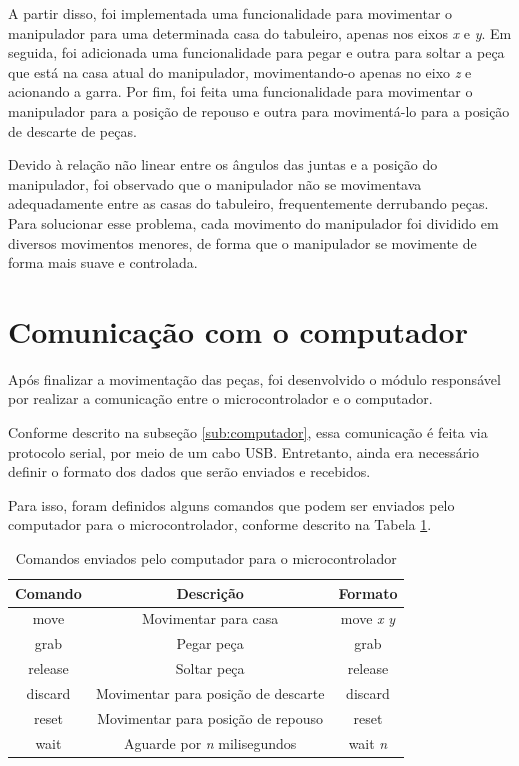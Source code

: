 A partir disso, foi implementada uma funcionalidade para movimentar o manipulador para uma determinada casa do tabuleiro, apenas nos eixos \textit{x} e \textit{y}.
Em seguida, foi adicionada uma funcionalidade para pegar e outra para soltar a peça que está na casa atual do manipulador, movimentando-o apenas no eixo \textit{z} e acionando a garra.
Por fim, foi feita uma funcionalidade para movimentar o manipulador para a posição de repouso e outra para movimentá-lo para a posição de descarte de peças.

Devido à relação não linear entre os ângulos das juntas e a posição do manipulador,
foi observado que o manipulador não se movimentava adequadamente entre as casas do tabuleiro,
frequentemente derrubando peças.
Para solucionar esse problema, cada movimento do manipulador foi dividido em diversos movimentos menores,
de forma que o manipulador se movimente de forma mais suave e controlada.

\section[Comunicação com o computador]{Comunicação com o computador}
\label{sec:comunicacaoComputador}

Após finalizar a movimentação das peças, foi desenvolvido o módulo responsável por realizar a comunicação entre o microcontrolador e o computador.

Conforme descrito na subseção \ref{sub:computador}, essa comunicação é feita via protocolo serial, por meio de um cabo USB.
Entretanto, ainda era necessário definir o formato dos dados que serão enviados e recebidos.

Para isso, foram definidos alguns comandos que podem ser enviados pelo computador para o microcontrolador, conforme descrito na Tabela \ref{tab:comandosMicrocontrolador}.

\begin{table}[H]
    \centering
    \caption{Comandos enviados pelo computador para o microcontrolador}
    \begin{tabular}{|c|c|c|}
        \hline
        \textbf{Comando} & \textbf{Descrição} & \textbf{Formato} \\
        \hline
        move & Movimentar para casa & move \textit{x} \textit{y} \\
        \hline
        grab & Pegar peça & grab \\
        \hline
        release & Soltar peça & release \\
        \hline
        discard & Movimentar para posição de descarte & discard \\
        \hline
        reset & Movimentar para posição de repouso & reset \\
        \hline
        wait & Aguarde por \textit{n} milisegundos & wait \textit{n} \\
        \hline
    \end{tabular}
    \label{tab:comandosMicrocontrolador}
\end{table}

